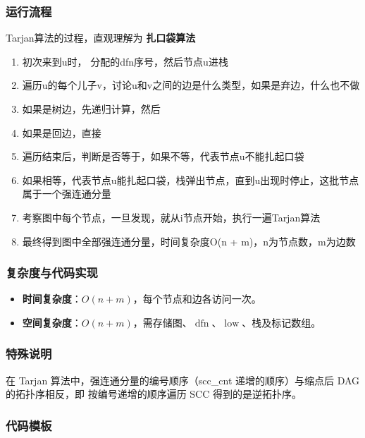 \subsubsection{运行流程}

Tarjan算法的过程，直观理解为 \textbf{扎口袋算法}

\begin{enumerate}
  \item 初次来到u时， 分配的dfn序号，然后节点u进栈
  \item 遍历u的每个儿子v，讨论u和v之间的边是什么类型，如果是弃边，什么也不做
  \item 如果是树边，先递归计算，然后
  \item 如果是回边，直接
  \item 遍历结束后，判断是否等于，如果不等，代表节点u不能扎起口袋
  \item 如果相等，代表节点u能扎起口袋，栈弹出节点，直到u出现时停止，这批节点属于一个强连通分量
  \item 考察图中每个节点，一旦发现，就从i节点开始，执行一遍Tarjan算法
  \item 最终得到图中全部强连通分量，时间复杂度O(n + m)，n为节点数，m为边数
\end{enumerate}

\subsubsection{复杂度与代码实现}

\begin{itemize}
  \item \textbf{时间复杂度}：$O(n + m)$，每个节点和边各访问一次。
  \item \textbf{空间复杂度}：$O(n + m)$，需存储图、$\operatorname{dfn}$、$\operatorname{low}$、栈及标记数组。
\end{itemize}

\subsubsection{特殊说明}

在 Tarjan 算法中，强连通分量的编号顺序（scc\_cnt 递增的顺序）与缩点后 DAG 的拓扑序相反，即 按编号递增的顺序遍历 SCC 得到的是逆拓扑序。

\subsubsection{代码模板}

